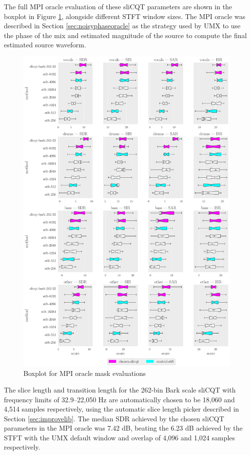 \documentclass[report.tex]{subfiles}
\begin{document}
The full MPI oracle evaluation of these sliCQT parameters are shown in the boxplot in Figure \ref{fig:oraclebssboxplot}, alongside different STFT window sizes. The MPI oracle was described in Section \ref{sec:noisyphaseoracle} as the strategy used by UMX to use the phase of the mix and estimated magnitude of the source to compute the final estimated source waveform.

\begin{figure}[ht]
	\centering
	\includegraphics[width=\textwidth]{./images-bss/oracle_boxplot.pdf}
	\caption{Boxplot for MPI oracle mask evaluations}
	\label{fig:oraclebssboxplot}
\end{figure}

The slice length and transition length for the 262-bin Bark scale sliCQT with frequency limits of 32.9--22,050 Hz are automatically chosen to be 18,060 and 4,514 samples respectively, using the automatic slice length picker described in Section \ref{sec:improvelib}. The median SDR achieved by the chosen sliCQT parameters in the MPI oracle was 7.42 dB, beating the 6.23 dB achieved by the STFT with the UMX default window and overlap of 4,096 and 1,024 samples respectively.
\end{document}
